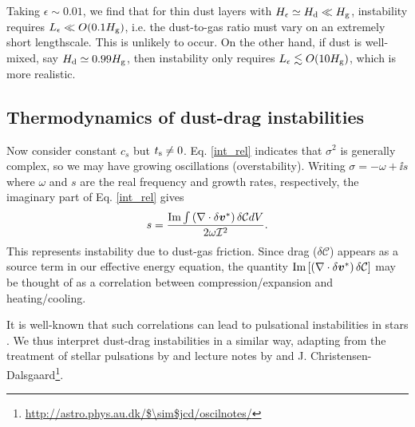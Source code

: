 Taking $\epsilon\sim 0.01$,  we find that 
for thin dust layers with $H_\epsilon \simeq H_\mathrm{d}\ll H_\mathrm{g}$,  instability
requires $L_\epsilon\ll O(0.1H_\mathrm{g})$, i.e. the dust-to-gas ratio must
vary on an extremely short lengthscale. 
This is unlikely to
occur. On the other hand, if dust is well-mixed, say $H_\mathrm{d}\simeq
0.99H_\mathrm{g}$, then instability only requires 
$L_\epsilon\lesssim O(10H_\mathrm{g})$, which is more realistic. 


\subsection{Thermodynamics of dust-drag instabilities}\label{dust_work}
Now consider constant $c_s$ but $t_\mathrm{s}\neq0$. 
Eq. \ref{int_rel} indicates that $\sigma^2$ is generally complex, so
we may have growing oscillations (overstability). Writing $\sigma =
-\omega + \ii s$ where $\omega$ and $s$ are the real frequency and
growth rates, respectively, the imaginary part of Eq. \ref{int_rel}
gives  
\begin{align}
  s = \frac{\operatorname{Im}\int \left(\nabla\cdot\delta\bm{v}^*\right)\delta\mathcal{C}dV}{2\omega\mathcal{I}^2}. \label{thermal_instability}
\end{align}
This represents instability due to dust-gas friction. 
Since drag ($\delta \mathcal{C}$) appears as a source term in our
effective energy equation, the quantity 
$\operatorname{Im}\left[\left(\nabla\cdot\delta\bm{v}^*\right)\delta\mathcal{C}\right]$
may be thought of as a correlation between compression/expansion and  
heating/cooling.  

It is well-known that such correlations can lead to pulsational
instabilities in stars \citep{cox67}. We thus interpret  
dust-drag instabilities in a similar way, 
adapting from the treatment of stellar 
pulsations by \cite{cox67} and lecture notes by \cite{samadi15} and 
J. Christensen-Dalsgaard\footnote{\url{http://astro.phys.au.dk/$\sim$jcd/oscilnotes/}}.      

